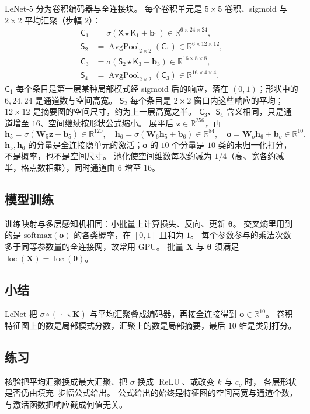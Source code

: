LeNet-5 分为卷积编码器与全连接块。
每个卷积单元是 $5\times 5$ 卷积、sigmoid 与 $2\times 2$ 平均汇聚（步幅 $2$）：
\begin{align*}
\mathsf{C}_1
&=
\sigma(\mathsf{X}\star\mathsf{K}_1+\bm{b}_1)
\in\mathbb{R}^{6\times 24\times 24},\\
\mathsf{S}_2
&=
\operatorname{AvgPool}_{2\times 2}(\mathsf{C}_1)
\in\mathbb{R}^{6\times 12\times 12},\\
\mathsf{C}_3
&=
\sigma(\mathsf{S}_2\star\mathsf{K}_3+\bm{b}_3)
\in\mathbb{R}^{16\times 8\times 8},\\
\mathsf{S}_4
&=
\operatorname{AvgPool}_{2\times 2}(\mathsf{C}_3)
\in\mathbb{R}^{16\times 4\times 4}.
\end{align*}
$\mathsf{C}_1$ 每个条目是第一层某种局部模式经 sigmoid 后的响应，落在 $(0,1)$；形状中的 $6,24,24$ 是通道数与空间高宽。
$\mathsf{S}_2$ 每个条目是 $2\times 2$ 窗口内这些响应的平均；$12\times 12$ 是摘要图的空间尺寸，约为上一层高宽之半。
$\mathsf{C}_3$、$\mathsf{S}_4$ 含义相同，只是通道增至 $16$、空间继续按形状公式缩小。
展平后 $\bm{z}\in\mathbb{R}^{256}$，再
\[
\bm{h}_5=\sigma(\bm{W}_5\bm{z}+\bm{b}_5)\in\mathbb{R}^{120},
\quad
\bm{h}_6=\sigma(\bm{W}_6\bm{h}_5+\bm{b}_6)\in\mathbb{R}^{84},
\quad
\bm{o}=\bm{W}_o\bm{h}_6+\bm{b}_o\in\mathbb{R}^{10}.
\]
$\bm{h}_5,\bm{h}_6$ 的分量是全连接隐单元的激活；$\bm{o}$ 的 $10$ 个分量是 $10$ 类的未归一化打分，不是概率，也不是空间尺寸。
池化使空间维数每次约减为 $1/4$（高、宽各约减半，格点数相乘），同时通道由 $6$ 增至 $16$。

\subsection{模型训练}

训练映射与多层感知机相同：小批量上计算损失、反向、更新 $\bm{\theta}$。
交叉熵里用到的是 $\mathrm{softmax}(\bm{o})$ 的各类概率，在 $[0,1]$ 且和为 $1$。
每个参数参与的乘法次数多于同等参数量的全连接网，故常用 GPU。
批量 $\bm{X}$ 与 $\bm{\theta}$ 须满足 $\operatorname{loc}(\bm{X})=\operatorname{loc}(\bm{\theta})$。

\subsection{小结}

LeNet 把 $\sigma\circ(\,\cdot\,\star\bm{K})$ 与平均汇聚叠成编码器，再接全连接得到 $\bm{o}\in\mathbb{R}^{10}$。
卷积特征图上的数是局部模式分数，汇聚上的数是局部摘要，最后 $10$ 维是类别打分。

\subsection{练习}

核验把平均汇聚换成最大汇聚、把 $\sigma$ 换成 $\operatorname{ReLU}$、或改变 $k$ 与 $c_o$ 时，
各层形状是否仍由填充--步幅公式给出。
公式给出的始终是特征图的空间高宽与通道个数，与激活函数把响应截成何值无关。
